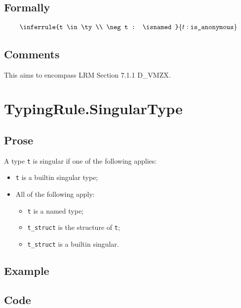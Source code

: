 \documentclass{book}
\begin{document}
\begin{formal}
      \subsection{Formally}
\newcommand\isanonymous[0]{\texttt{is\_anonymous}}
\[
\begin{array}{c}
\inferrule{t \in \ty \\ \neg t : \isnamed}{t : \isanonymous}
\end{array}
\]
\end{formal}

    \subsection{Comments}
    This aims to encompass LRM Section 7.1.1 D\_VMZX.

\section{TypingRule.SingularType}

    \subsection{Prose}
    A type \texttt{t} is singular if one of the following applies:
    \begin{itemize}
    \item \texttt{t} is a builtin singular type;
    \item All of the following apply:
      \begin{itemize}
      \item \texttt{t} is a named type;
      \item \texttt{t\_struct} is the structure of \texttt{t};
      \item \texttt{t\_struct} is a builtin singular.
      \end{itemize} 
    \end{itemize}

    \subsection{Example}

    \subsection{Code}
\end{document}
